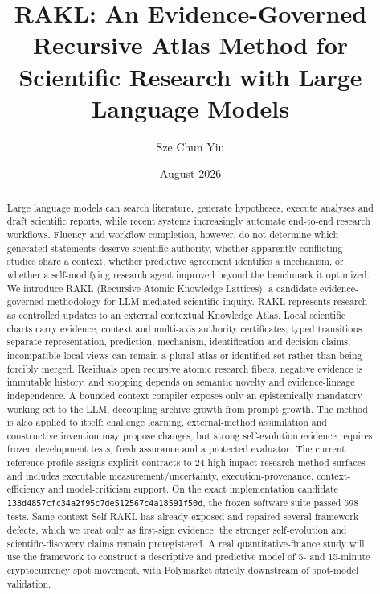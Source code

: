 \documentclass[11pt]{article}
\title{RAKL: An Evidence-Governed Recursive Atlas Method for Scientific Research with Large Language Models}
\author{Sze Chun Yiu}
\date{August 2026}
\newcommand{\RAKL}{\textsc{RAKL}}
\newcommand{\SoftwareTests}{598}
\newcommand{\ImplementationSHA}{\texttt{138d4857cfc34a2f95c7de512567c4a18591f50d}}
\begin{document}
\maketitle

\begin{abstract}
Large language models can search literature, generate hypotheses, execute analyses and draft scientific reports, while recent systems increasingly automate end-to-end research workflows. Fluency and workflow completion, however, do not determine which generated statements deserve scientific authority, whether apparently conflicting studies share a context, whether predictive agreement identifies a mechanism, or whether a self-modifying research agent improved beyond the benchmark it optimized. We introduce \RAKL{} (Recursive Atomic Knowledge Lattices), a candidate evidence-governed methodology for LLM-mediated scientific inquiry. \RAKL{} represents research as controlled updates to an external contextual Knowledge Atlas. Local scientific charts carry evidence, context and multi-axis authority certificates; typed transitions separate representation, prediction, mechanism, identification and decision claims; incompatible local views can remain a plural atlas or identified set rather than being forcibly merged. Residuals open recursive atomic research fibers, negative evidence is immutable history, and stopping depends on semantic novelty and evidence-lineage independence. A bounded context compiler exposes only an epistemically mandatory working set to the LLM, decoupling archive growth from prompt growth. The method is also applied to itself: challenge learning, external-method assimilation and constructive invention may propose changes, but strong self-evolution evidence requires frozen development tests, fresh assurance and a protected evaluator. The current reference profile assigns explicit contracts to 24 high-impact research-method surfaces and includes executable measurement/uncertainty, execution-provenance, context-efficiency and model-criticism support. On the exact implementation candidate \ImplementationSHA{}, the frozen software suite passed \SoftwareTests{} tests. Same-context Self-\RAKL{} has already exposed and repaired several framework defects, which we treat only as first-sign evidence; the stronger self-evolution and scientific-discovery claims remain preregistered. A real quantitative-finance study will use the framework to construct a descriptive and predictive model of 5- and 15-minute cryptocurrency spot movement, with Polymarket strictly downstream of spot-model validation.
\end{abstract}
\end{document}
